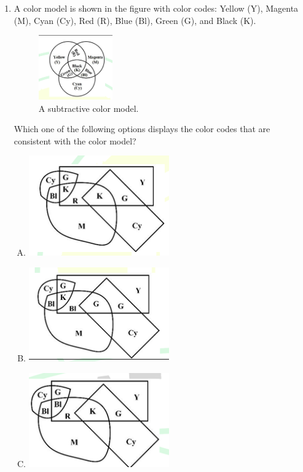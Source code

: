 \documentclass[14pt, a4paper]{extarticle}
\begin{document}
\begin{enumerate}[label=\textbf{Q.\arabic*}]
\item A color model is shown in the figure with color codes: Yellow (Y), Magenta (M), Cyan (Cy), Red (R), Blue (Bl), Green (G), and Black (K).
\begin{figure}[H]
\centering
\includegraphics[width=0.3\textwidth]{figs/q8fig25.png}
\caption{A subtractive color model.}
\label{fig:q8_color_model}
\end{figure}
Which one of the following options displays the color codes that are consistent with the color model?
\begin{enumerate}[(A)]
\item \includegraphics[width=0.5\textwidth]{figs/q8figa25.png}
\item \includegraphics[width=0.5\textwidth]{figs/q8figb25.png}
\item \includegraphics[width=0.5\textwidth]{figs/q8figc25.png}

\end{enumerate}
\end{enumerate}
\end{document}
